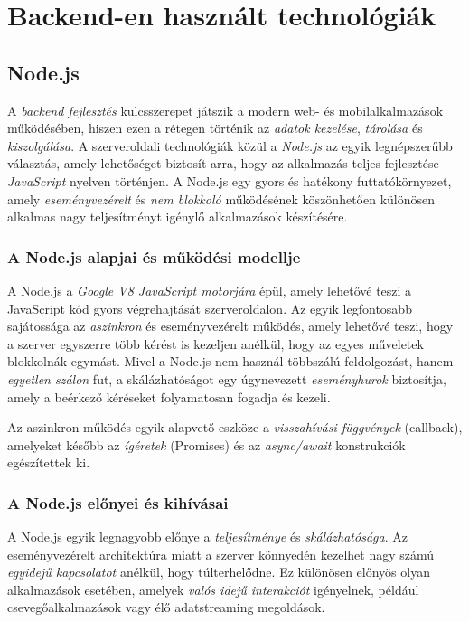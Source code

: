 \documentclass[
]{thesis-ekf}
\theoremstyle{definition}
\theoremstyle{remark}
\begin{document}
\chapter{Backend-en használt technológiák}
\section{Node.js}
A \emph{backend fejlesztés} kulcsszerepet játszik a modern web- és mobilalkalmazások működésében, hiszen ezen a rétegen történik az \emph{adatok kezelése}, \emph{tárolása} és \emph{kiszolgálása}. A szerveroldali technológiák közül a \emph{Node.js} az egyik legnépszerűbb választás, amely lehetőséget biztosít arra, hogy az alkalmazás teljes fejlesztése \emph{JavaScript} nyelven történjen. A Node.js egy gyors és hatékony futtatókörnyezet, amely \emph{eseményvezérelt} és \emph{nem blokkoló} működésének köszönhetően különösen alkalmas nagy teljesítményt igénylő alkalmazások készítésére.

\subsection{A Node.js alapjai és működési modellje}
A Node.js a \emph{Google V8 JavaScript motorjára} épül, amely lehetővé teszi a JavaScript kód gyors végrehajtását szerveroldalon. Az egyik legfontosabb sajátossága az \emph{aszinkron} és eseményvezérelt működés, amely lehetővé teszi, hogy a szerver egyszerre több kérést is kezeljen anélkül, hogy az egyes műveletek blokkolnák egymást. Mivel a Node.js nem használ többszálú feldolgozást, hanem \emph{egyetlen szálon} fut, a skálázhatóságot egy úgynevezett \emph{eseményhurok} biztosítja, amely a beérkező kéréseket folyamatosan fogadja és kezeli. \cite{tilkovNode}

Az aszinkron működés egyik alapvető eszköze a \emph{visszahívási függvények} (callback), amelyeket később az \emph{ígéretek} (Promises) és az \emph{async/await} konstrukciók egészítettek ki.

\subsection{A Node.js előnyei és kihívásai}
A Node.js egyik legnagyobb előnye a \emph{teljesítménye} és \emph{skálázhatósága}. Az eseményvezérelt architektúra miatt a szerver könnyedén kezelhet nagy számú \emph{egyidejű kapcsolatot} anélkül, hogy túlterhelődne. Ez különösen előnyös olyan alkalmazások esetében, amelyek \emph{valós idejű interakciót} igényelnek, például csevegőalkalmazások vagy élő adatstreaming megoldások.
\end{document}
